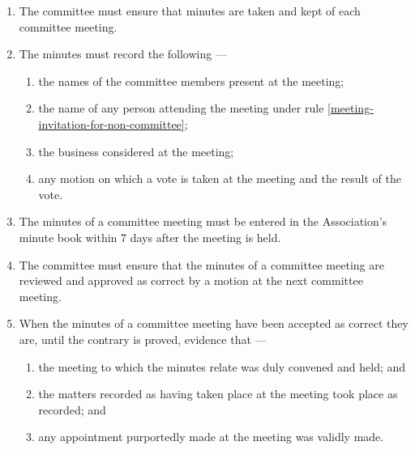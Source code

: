 \documentclass[../constitution.tex]{subfiles}
\begin{document}
\begin{enumerate}

  \item The committee must ensure that minutes are taken and kept of each committee meeting.
  \item The minutes must record the following ---

        \begin{enumerate}

          \item the names of the committee members present at the meeting;
          \item the name of any person attending the meeting under rule \ref{meeting-invitation-for-non-committee};
          \item the business considered at the meeting;
          \item any motion on which a vote is taken at the meeting and the result of the vote.
        \end{enumerate}
  \item The minutes of a committee meeting must be entered in the Association's minute book within 7 days after the meeting is held.
  \item The committee must ensure that the minutes of a committee meeting are reviewed and approved as correct by a motion at the next committee meeting.
  \item When the minutes of a committee meeting have been accepted as correct they are, until the contrary is proved, evidence that ---

        \begin{enumerate}

          \item the meeting to which the minutes relate was duly convened and held; and
          \item the matters recorded as having taken place at the meeting took place as recorded; and
          \item any appointment purportedly made at the meeting was validly made.
        \end{enumerate}
\end{enumerate}

\end{document}
